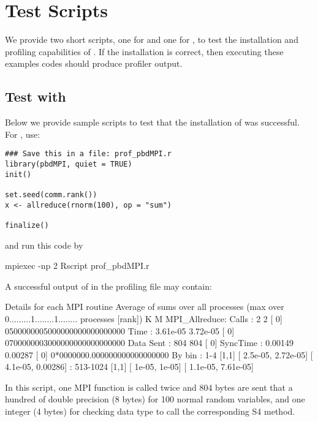 \section{Test Scripts}

We provide two short  scripts, one for  and one for 
, to test the installation and profiling capabilities of 
.  If the installation is correct, then executing these examples 
codes should produce profiler output.


\subsection{Test with }

Below we provide sample scripts to test that the installation of
 was successful.  For , use:
\begin{lstlisting}[language=rr,title=Test script for pbdMPI]
### Save this in a file: prof_pbdMPI.r
library(pbdMPI, quiet = TRUE)
init()

set.seed(comm.rank())
x <- allreduce(rnorm(100), op = "sum")

finalize()
\end{lstlisting}
and run this code by
\begin{Code}
mpiexec -np 2 Rscript prof_pbdMPI.r
\end{Code}

A successful output of 
in the profiling file  may contain:
\begin{Output}
Details for each MPI routine
                  Average of sums over all processes
                                (max over          0.........1........1........
                                 processes [rank])           K        M
MPI_Allreduce:
        Calls     :          2            2 [   0] 0500000005000000000000000000
        Time      :   3.61e-05     3.72e-05 [   0] 0700000003000000000000000000
        Data Sent :        804          804 [   0]
        SyncTime  :    0.00149      0.00287 [   0] 0*0000000.000000000000000000
        By bin    : 1-4 [1,1]   [   2.5e-05,  2.72e-05] [   4.1e-05,   0.00286]
                  : 513-1024    [1,1]   [     1e-05,     1e-05] [   1.1e-05,  7.61e-05]
\end{Output}
In this  script,
one MPI  function  is called twice and
804 bytes are sent that a hundred of double precision (8 bytes) for
100 normal random variables, and one integer (4 bytes) for checking
data type to call the corresponding S4 method.


